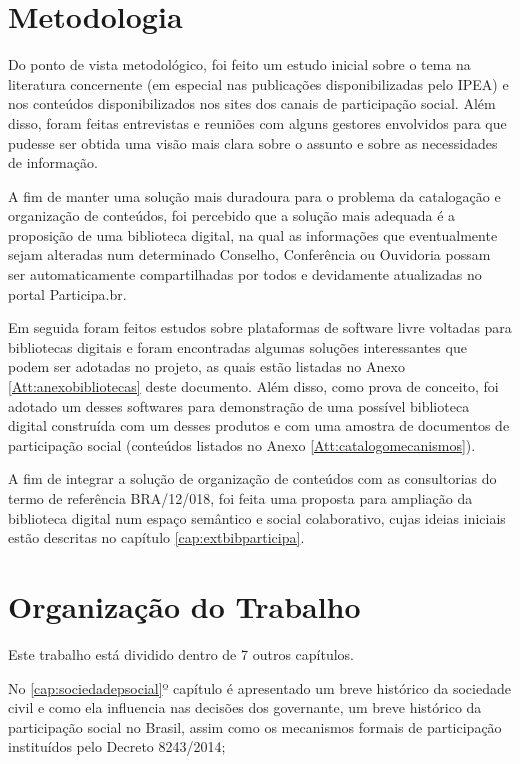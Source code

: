 \section{Metodologia}

Do ponto de vista metodológico, foi feito um estudo inicial sobre o tema na literatura concernente (em especial nas publicações disponibilizadas pelo IPEA) e nos conteúdos disponibilizados nos sites dos canais de participação social. Além disso, foram feitas entrevistas e reuniões com alguns gestores envolvidos para que pudesse ser obtida uma visão mais clara sobre o assunto e sobre as necessidades de informação.

A fim de manter uma solução mais duradoura para o problema da catalogação e organização de conteúdos, foi percebido que a solução mais adequada é a proposição de uma biblioteca digital, na qual as informações que eventualmente sejam alteradas num determinado Conselho, Conferência ou Ouvidoria possam ser automaticamente compartilhadas por todos e devidamente atualizadas no portal Participa.br.

Em seguida foram feitos estudos sobre plataformas de software livre voltadas para bibliotecas digitais e foram encontradas algumas soluções interessantes que podem ser adotadas no projeto, as quais estão listadas no Anexo \ref{Att:anexobibliotecas} deste documento. Além disso, como prova de conceito, foi adotado um desses softwares para demonstração de uma possível biblioteca digital construída com um desses produtos e com uma amostra de documentos de participação social (conteúdos listados no Anexo \ref{Att:catalogomecanismos}).

A fim de integrar a solução de organização de conteúdos com as consultorias do termo de referência BRA/12/018, foi feita uma proposta para ampliação da biblioteca digital num espaço semântico e social colaborativo, cujas ideias iniciais estão descritas no capítulo \ref{cap:extbibparticipa}.

\section{Organização do Trabalho}

Este trabalho está dividido dentro de 7 outros capítulos. 

No \ref{cap:sociedadepsocial}º capítulo é apresentado um breve histórico da sociedade civil e como ela influencia nas decisões dos governante, um breve histórico da participação social no Brasil, assim como os mecanismos formais de participação instituídos pelo Decreto 8243/2014;

